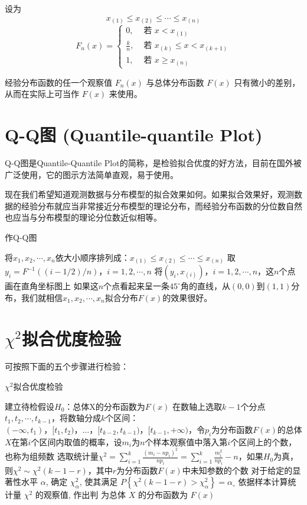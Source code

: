 设为
$$
x_{(1)} \leq x_{(2)} \leq \cdots \leq x_{(n)}
$$
$$
F_{n}(x)=\left\{\begin{array}{ll}
0, & \text { 若 } x<x_{(1)} \\
\frac{k}{n}, & \text { 若 } x_{(k)} \leq x<x_{(k+1)} \\
1, & \text { 若 } x \geq x_{(n)}
\end{array}\right.
$$

经验分布函数的任一个观察值 $F_n(x)$ 与总体分布函数 $F(x)$ 只有微小的差别，从而在实际上可当作 $F(x)$ 来使用。

\section{Q-Q图 (Quantile-quantile Plot)}

Q-Q图是Quantile-Quantile Plot的简称，是检验拟合优度的好方法，目前在国外被广泛使用，它的图示方法简单直观，易于使用。

现在我们希望知道观测数据与分布模型的拟合效果如何。如果拟合效果好，观测数据的经验分布就应当非常接近分布模型的理论分布，而经验分布函数的分位数自然也应当与分布模型的理论分位数近似相等。

\begin{algorithm}
    \caption{作Q-Q图}
    
将$x_1,x_2,\cdots,x_n$依大小顺序排列成：$x_{(1)}\le x_{(2)}\le\cdots\le x_{(n)}$\;
取$y_i=F^{-1}((i-1/2)/n)，i=1,2,\cdots,n$\;
将$(y_i,x_{(i)})，i=1,2,\cdots,n$，这$n$个点画在直角坐标图上\;
如果这$n$个点看起来呈一条$45^\circ$角的直线，从$(0,0)$到$(1,1)$分布，我们就相信$x_1,x_2,\cdots,x_n$拟合分布$F(x)$的效果很好。
\end{algorithm}

\section{$\chi^2$拟合优度检验}

可按照下面的五个步骤进行检验：

\begin{algorithm}
\caption{$\chi^2$拟合优度检验}
建立待检假设$H_0$：总体X的分布函数为$F(x)$\;
在数轴上选取$k-1$个分点$t_1,t_2,\cdots,t_{k-1}$，将数轴分成$k$个区间：$(-\infty,t_1)，[t_1,t_2)，…，[t_{k-2},t_{k-1})，[t_{k-1},+\infty)$，令$p_i$为分布函数$F(x)$的总体$X$在第$i$个区间内取值的概率，设$m_i$为$n$个样本观察值中落入第$i$个区间上的个数，也称为组频数\;
选取统计量$\chi^2=\sum_{i=1}^{k}\frac{(m_i-np_i)^2}{np_i}=\sum_{i=1}^{k}{\frac{m_i^2}{np_i}-n}$，如果$H_0$为真，则$\chi^2 \sim \chi^2(k-1-r)$，其中$r$为分布函数$F(x)$中未知参数的个数\;
对于给定的显著性水平 \( \alpha \), 确定 \( \chi_{\alpha}^{2} \), 使其满足 \( P\left\{\chi^{2}(k-1-r)>\chi_{\alpha}^{2}\right\}=\alpha_{\circ} \) \;
依据样本计算统计量 \( \chi^{2} \) 的观察值, 作出判
为总体 \( X \) 的分布函数为 \( F(x) \) \;
\end{algorithm}

